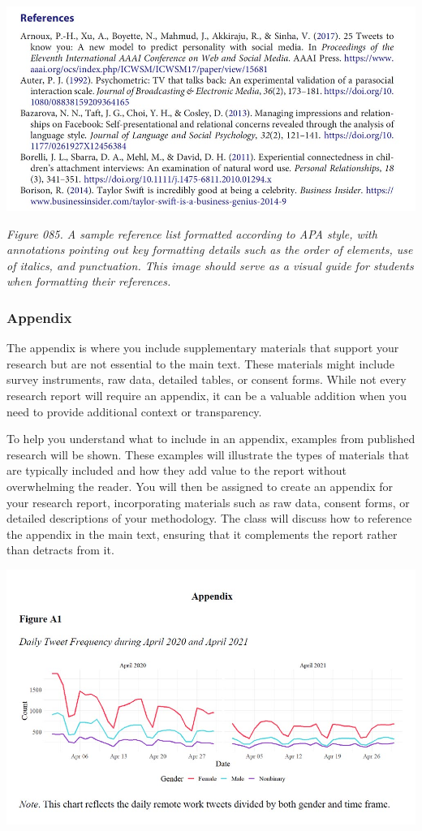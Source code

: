 \documentclass[
]{book}
\begin{document}
\includegraphics[width=1\textwidth,height=\textheight]{images/fig085.jpg}

\emph{Figure 085. A sample reference list formatted according to APA style, with annotations pointing out key formatting details such as the order of elements, use of italics, and punctuation. This image should serve as a visual guide for students when formatting their references.}

\subsubsection{Appendix}\label{appendix}

The appendix is where you include supplementary materials that support your research but are not essential to the main text. These materials might include survey instruments, raw data, detailed tables, or consent forms. While not every research report will require an appendix, it can be a valuable addition when you need to provide additional context or transparency.

To help you understand what to include in an appendix, examples from published research will be shown. These examples will illustrate the types of materials that are typically included and how they add value to the report without overwhelming the reader. You will then be assigned to create an appendix for your research report, incorporating materials such as raw data, consent forms, or detailed descriptions of your methodology. The class will discuss how to reference the appendix in the main text, ensuring that it complements the report rather than detracts from it.

\includegraphics[width=1\textwidth,height=\textheight]{images/fig086.jpg}
\end{document}
